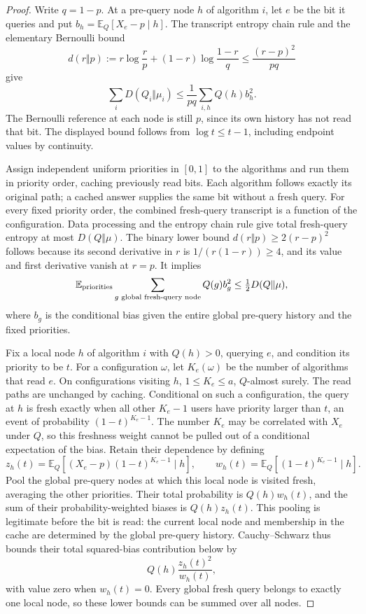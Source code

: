 \documentclass[11pt]{article}
\theoremstyle{definition}
\begin{document}
\begin{proof}
Write $q=1-p$. At a pre-query node $h$ of algorithm $i$, let $e$
be the bit it queries and put
$b_h=\mathbb E_Q[X_e-p\mid h]$. The transcript entropy chain rule and
the elementary Bernoulli bound
\[
 d(r\Vert p):=r\log\frac rp+(1-r)\log\frac{1-r}q
 \le\frac{(r-p)^2}{pq}
\]
give
\begin{equation}\label{eq:local-transcript-entropy}
 \sum_iD(Q_i\Vert\mu_i)
 \le\frac1{pq}\sum_{i,h}Q(h)b_h^2.
\end{equation}
The Bernoulli reference at each node is still $p$, since its own
history has not read that bit. The displayed bound follows from
$\log t\le t-1$, including endpoint values by continuity.

Assign independent uniform priorities in $[0,1]$ to the algorithms
and run them in priority order, caching previously read bits. Each
algorithm follows exactly its original path; a cached answer supplies
the same bit without a fresh query. For every fixed priority order,
the combined fresh-query transcript is a function of the configuration.
Data processing and the entropy chain rule give total fresh-query
entropy at most $D(Q\Vert\mu)$. The binary lower bound
$d(r\Vert p)\ge2(r-p)^2$ follows because its second derivative in
$r$ is $1/(r(1-r))\ge4$, and its value and first derivative vanish
at $r=p$. It implies
\begin{equation}\label{eq:global-transcript-budget}
 \mathbb E_{\rm priorities}
 \sum_{g\text{ global fresh-query node}}Q(g)b_g^2
 \le\tfrac12D(Q\Vert\mu),
\end{equation}
where $b_g$ is the conditional bias given the entire global pre-query
history and the fixed priorities.

Fix a local node $h$ of algorithm $i$ with $Q(h)>0$, querying $e$,
and condition its priority to be $t$. For a configuration $\omega$,
let $K_e(\omega)$ be the number of algorithms that read $e$.
On configurations visiting $h$, $1\le K_e\le a$, $Q$-almost surely.
The read paths are unchanged by caching. Conditional on such a
configuration, the query at $h$ is fresh exactly when all other
$K_e-1$ users have priority larger than $t$, an event of probability
$(1-t)^{K_e-1}$.
The number $K_e$ may be correlated with $X_e$ under $Q$, so this
freshness weight cannot be pulled out of a conditional expectation of
the bias. Retain their dependence by defining
\[
 z_h(t)=\mathbb E_Q[(X_e-p)(1-t)^{K_e-1}\mid h],\qquad
 w_h(t)=\mathbb E_Q[(1-t)^{K_e-1}\mid h].
\]
Pool the global pre-query nodes at which this local node is visited
fresh, averaging the other priorities. Their total probability is
$Q(h)w_h(t)$, and the sum of their probability-weighted biases is
$Q(h)z_h(t)$. This pooling is legitimate before the bit is read:
the current local node and membership in the cache are determined by
the global pre-query history. Cauchy--Schwarz thus bounds their
total squared-bias contribution below by
\begin{equation}\label{eq:entropy-pooled-bias}
 Q(h)\frac{z_h(t)^2}{w_h(t)},
\end{equation}
with value zero when $w_h(t)=0$.
Every global fresh query belongs to exactly one local node, so these
lower bounds can be summed over all nodes.


\end{proof}
\end{document}
